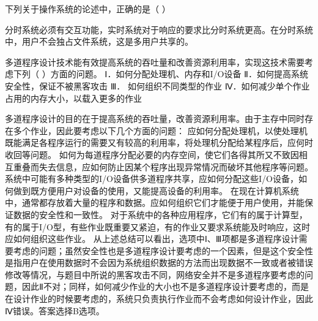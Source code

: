 \question 下列关于操作系统的论述中，正确的是（ ）
\par{}
\begin{solution}分时系统必须有交互功能，实时系统对于响应的要求比分时系统更高。在分时系统中，用户不会独占文件系统，这是多用户共享的。
\end{solution}
\question 多道程序设计技术能有效提高系统的吞吐量和改善资源利用率，实现这技术需要考虑下列（
）方面的问题。 Ⅰ．如何分配处理机、内存和I/O设备
Ⅱ．如何提高系统安全性，保证不被黑客攻击 Ⅲ． 如何组织不同类型的作业
Ⅳ．如何减少单个作业占用的内存大小，以载入更多的作业
\par{}
\begin{solution}多道程序设计的目的在于提高系统的吞吐量，改善资源利用率。由于主存中同时存在多个作业，因此要考虑以下几个方面的问题：
应如何分配处理机，以使处理机既能满足各程序运行的需要又有较高的利用率，将处理机分配给某程序后，应何时收回等问题。
如何为每道程序分配必要的内存空间，使它们各得其所又不致因相互重叠而失去信息，应如何防止因某个程序出现异常情况而破坏其他程序等问题。
系统中可能有多种类型的I/O设备供多道程序共享，应如何分配这些I/O设备，如何做到既方便用户对设备的使用，又能提高设备的利用率。
在现在计算机系统中，通常都存放着大量的程序和数据。应如何组织它们才能便于用户使用，并能保证数据的安全性和一致性。
对于系统中的各种应用程序，它们有的属于计算型，有的属于I/O型，有些作业既重要又紧迫，有的作业又要求系统能及时响应，这时应如何组织这些作业。
从上述总结可以看出，选项中Ⅰ、Ⅲ项都是多道程序设计需要考虑的问题；虽然安全性也是多道程序设计要考虑的一个因素，但是这个安全性是指用户在使用数据时不会因为系统组织数据的方法而出现数据不一致或者被错误修改等情况，与题目中所说的黑客攻击不同，网络安全并不是多道程序要考虑的问题，因此Ⅱ不对；同样，如何减少作业的大小也不是多道程序设计要考虑的，而是在设计作业的时候要考虑的，系统只负责执行作业而不会考虑如何设计作业，因此Ⅳ错误。答案选择B选项。
\end{solution}
